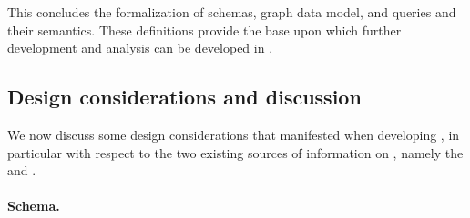 
This concludes the formalization of \gql schemas, graph data model, and queries and their semantics.  These definitions provide the base upon which further development and analysis can be developed in \gcoql.


\subsection{Design considerations and discussion}\label{subsec:discussion}

We now discuss some design considerations that manifested when developing 
\gcoql, in particular with respect to the two existing sources of information on \gql, namely the \spec and \HP.


\paragraph{Schema.}

